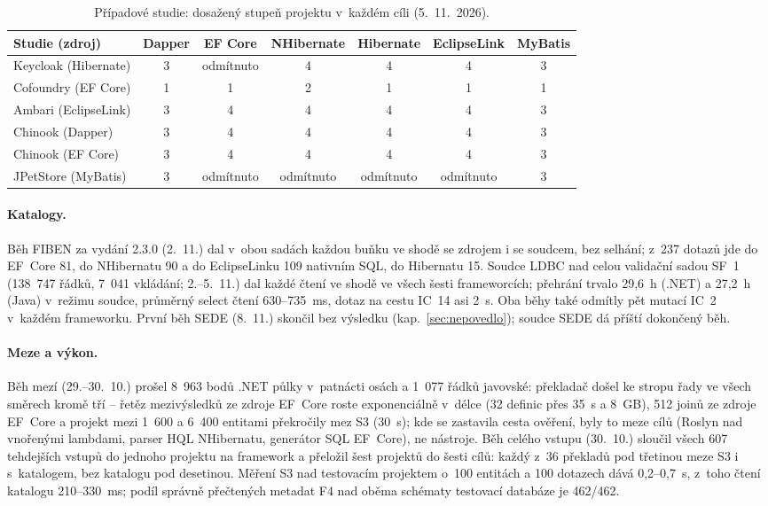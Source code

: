 \documentclass{article}
\begin{document}
\begin{table}[ht]
\centering\small
\begin{tabular}{l c c c c c c}
\toprule
\textbf{Studie (zdroj)} & \textbf{Dapper} & \textbf{EF Core} & \textbf{NHibernate} & \textbf{Hibernate} & \textbf{EclipseLink} & \textbf{MyBatis} \\
\midrule
Keycloak (Hibernate) & 3 & odmítnuto & 4 & 4 & 4 & 3 \\
Cofoundry (EF Core) & 1 & 1 & 2 & 1 & 1 & 1 \\
Ambari (EclipseLink) & 3 & 4 & 4 & 4 & 4 & 3 \\
Chinook (Dapper) & 3 & 4 & 4 & 4 & 4 & 3 \\
Chinook (EF Core) & 3 & 4 & 4 & 4 & 4 & 3 \\
JPetStore (MyBatis) & 3 & odmítnuto & odmítnuto & odmítnuto & odmítnuto & 3 \\
\bottomrule
\end{tabular}
\caption{Případové studie: dosažený stupeň projektu v~každém cíli (5.~11.~2026).}
\label{tab:studie}
\end{table}

\paragraph{Katalogy.} Běh FIBEN za vydání 2.3.0 (2.~11.) dal v~obou sadách každou buňku ve shodě se zdrojem i se soudcem, bez selhání; z~237 dotazů jde do EF~Core 81, do NHibernatu 90 a do EclipseLinku 109 nativním SQL, do Hibernatu 15. Soudce LDBC nad celou validační sadou SF~1 (138~747 řádků, 7~041 vkládání; 2.--5.~11.) dal každé čtení ve shodě ve všech šesti frameworcích; přehrání trvalo 29,6~h (.NET) a 27,2~h (Java) v~režimu soudce, průměrný select čtení 630--735~ms, dotaz na cestu IC~14 asi 2~s. Oba běhy také odmítly pět mutací IC~2 v~každém frameworku. První běh SEDE (8.~11.) skončil bez výsledku (kap.~\ref{sec:nepovedlo}); soudce SEDE dá příští dokončený běh.

\paragraph{Meze a výkon.} Běh mezí (29.--30.~10.) prošel 8~963 bodů .NET půlky v~patnácti osách a 1~077 řádků javovské: překladač došel ke stropu řady ve všech směrech kromě tří -- řetěz mezivýsledků ze zdroje EF~Core roste exponenciálně v~délce (32 definic přes 35~s a 8~GB), 512 joinů ze zdroje EF~Core a projekt mezi 1~600 a 6~400 entitami překročily mez S3 (30~s); kde se zastavila cesta ověření, byly to meze cílů (Roslyn nad vnořenými lambdami, parser HQL NHibernatu, generátor SQL EF~Core), ne nástroje. Běh celého vstupu (30.~10.) sloučil všech 607 tehdejších vstupů do jednoho projektu na framework a přeložil šest projektů do šesti cílů: každý z~36 překladů pod třetinou meze S3 i s~katalogem, bez katalogu pod desetinou. Měření S3 nad testovacím projektem o~100 entitách a 100 dotazech dává 0,2--0,7~s, z~toho čtení katalogu 210--330~ms; podíl správně přečtených metadat F4 nad oběma schématy testovací databáze je 462/462.
\end{document}
